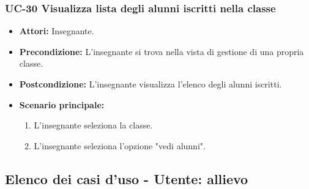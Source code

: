 \subsubsection{UC-30 Visualizza lista degli alunni iscritti nella classe}		
\begin{itemize}
	\item \textbf{Attori:} Insegnante.
	\item \textbf{Precondizione:} L'insegnante si trova nella vista di gestione di una propria classe.
	\item \textbf{Postcondizione:} L'insegnante visualizza l'elenco degli alunni iscritti.
	\item \textbf{Scenario principale:}
	\begin{enumerate}
		\item L'insegnante seleziona la classe.
		\item L'insegnante seleziona l'opzione "vedi alunni".
	\end{enumerate}		
\end{itemize}


\subsection{Elenco dei casi d'uso - Utente: allievo}	
